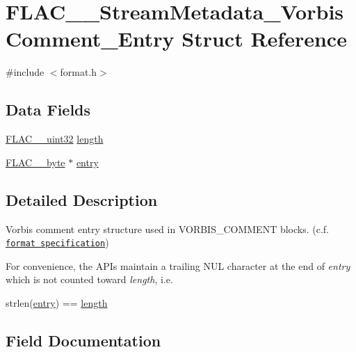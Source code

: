 \hypertarget{struct_f_l_a_c_____stream_metadata___vorbis_comment___entry}{}\section{F\+L\+A\+C\+\_\+\+\_\+\+Stream\+Metadata\+\_\+\+Vorbis\+Comment\+\_\+\+Entry Struct Reference}
\label{struct_f_l_a_c_____stream_metadata___vorbis_comment___entry}


{\ttfamily \#include $<$format.\+h$>$}

\subsection*{Data Fields}
\begin{DoxyCompactItemize}
\item 
\hyperlink{ordinals_8h_a9c4005ea7ef8d564b0cc993cdd0e4e5e}{F\+L\+A\+C\+\_\+\+\_\+uint32} \hyperlink{struct_f_l_a_c_____stream_metadata___vorbis_comment___entry_aa375f16819aaa4f7e08d8009167cb19e}{length}
\item 
\hyperlink{ordinals_8h_a5eb569b12d5b047cdacada4d57924ee3}{F\+L\+A\+C\+\_\+\+\_\+byte} $\ast$ \hyperlink{struct_f_l_a_c_____stream_metadata___vorbis_comment___entry_a78944f78822b92e7a4e5f15f118f6132}{entry}
\end{DoxyCompactItemize}


\subsection{Detailed Description}
Vorbis comment entry structure used in V\+O\+R\+B\+I\+S\+\_\+\+C\+O\+M\+M\+E\+NT blocks. (c.\+f. \href{../format.html#metadata_block_vorbis_comment}{\tt format specification})

For convenience, the A\+P\+Is maintain a trailing N\+UL character at the end of {\itshape entry} which is not counted toward {\itshape length}, i.\+e. 
\begin{DoxyCode}
strlen(\hyperlink{struct_f_l_a_c_____stream_metadata___vorbis_comment___entry_a78944f78822b92e7a4e5f15f118f6132}{entry}) == \hyperlink{struct_f_l_a_c_____stream_metadata___vorbis_comment___entry_aa375f16819aaa4f7e08d8009167cb19e}{length} 
\end{DoxyCode}
 

\subsection{Field Documentation}
\mbox{\label{struct_f_l_a_c_____stream_metadata___vorbis_comment___entry_a78944f78822b92e7a4e5f15f118f6132}} 

